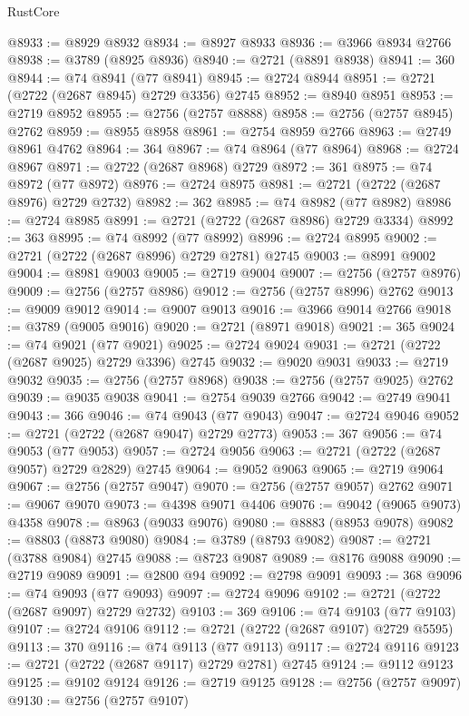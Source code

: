 \begin{lexlean}{RustCore}
\begin{coremodule}
@8933 := @8929 @8932
@8934 := @8927 @8933
@8936 := @3966 @8934 @2766
@8938 := @3789 (@8925 @8936)
@8940 := @2721 (@8891 @8938)
@8941 := 360
@8944 := @74 @8941 (@77 @8941)
@8945 := @2724 @8944
@8951 := @2721 (@2722 (@2687 @8945) @2729 @3356) @2745
@8952 := @8940 @8951
@8953 := @2719 @8952
@8955 := @2756 (@2757 @8888)
@8958 := @2756 (@2757 @8945) @2762
@8959 := @8955 @8958
@8961 := @2754 @8959 @2766
@8963 := @2749 @8961 @4762
@8964 := 364
@8967 := @74 @8964 (@77 @8964)
@8968 := @2724 @8967
@8971 := @2722 (@2687 @8968) @2729
@8972 := 361
@8975 := @74 @8972 (@77 @8972)
@8976 := @2724 @8975
@8981 := @2721 (@2722 (@2687 @8976) @2729 @2732)
@8982 := 362
@8985 := @74 @8982 (@77 @8982)
@8986 := @2724 @8985
@8991 := @2721 (@2722 (@2687 @8986) @2729 @3334)
@8992 := 363
@8995 := @74 @8992 (@77 @8992)
@8996 := @2724 @8995
@9002 := @2721 (@2722 (@2687 @8996) @2729 @2781) @2745
@9003 := @8991 @9002
@9004 := @8981 @9003
@9005 := @2719 @9004
@9007 := @2756 (@2757 @8976)
@9009 := @2756 (@2757 @8986)
@9012 := @2756 (@2757 @8996) @2762
@9013 := @9009 @9012
@9014 := @9007 @9013
@9016 := @3966 @9014 @2766
@9018 := @3789 (@9005 @9016)
@9020 := @2721 (@8971 @9018)
@9021 := 365
@9024 := @74 @9021 (@77 @9021)
@9025 := @2724 @9024
@9031 := @2721 (@2722 (@2687 @9025) @2729 @3396) @2745
@9032 := @9020 @9031
@9033 := @2719 @9032
@9035 := @2756 (@2757 @8968)
@9038 := @2756 (@2757 @9025) @2762
@9039 := @9035 @9038
@9041 := @2754 @9039 @2766
@9042 := @2749 @9041
@9043 := 366
@9046 := @74 @9043 (@77 @9043)
@9047 := @2724 @9046
@9052 := @2721 (@2722 (@2687 @9047) @2729 @2773)
@9053 := 367
@9056 := @74 @9053 (@77 @9053)
@9057 := @2724 @9056
@9063 := @2721 (@2722 (@2687 @9057) @2729 @2829) @2745
@9064 := @9052 @9063
@9065 := @2719 @9064
@9067 := @2756 (@2757 @9047)
@9070 := @2756 (@2757 @9057) @2762
@9071 := @9067 @9070
@9073 := @4398 @9071 @4406
@9076 := @9042 (@9065 @9073) @4358
@9078 := @8963 (@9033 @9076)
@9080 := @8883 (@8953 @9078)
@9082 := @8803 (@8873 @9080)
@9084 := @3789 (@8793 @9082)
@9087 := @2721 (@3788 @9084) @2745
@9088 := @8723 @9087
@9089 := @8176 @9088
@9090 := @2719 @9089
@9091 := @2800 @94
@9092 := @2798 @9091
@9093 := 368
@9096 := @74 @9093 (@77 @9093)
@9097 := @2724 @9096
@9102 := @2721 (@2722 (@2687 @9097) @2729 @2732)
@9103 := 369
@9106 := @74 @9103 (@77 @9103)
@9107 := @2724 @9106
@9112 := @2721 (@2722 (@2687 @9107) @2729 @5595)
@9113 := 370
@9116 := @74 @9113 (@77 @9113)
@9117 := @2724 @9116
@9123 := @2721 (@2722 (@2687 @9117) @2729 @2781) @2745
@9124 := @9112 @9123
@9125 := @9102 @9124
@9126 := @2719 @9125
@9128 := @2756 (@2757 @9097)
@9130 := @2756 (@2757 @9107)

\end{coremodule}
\end{lexlean}
